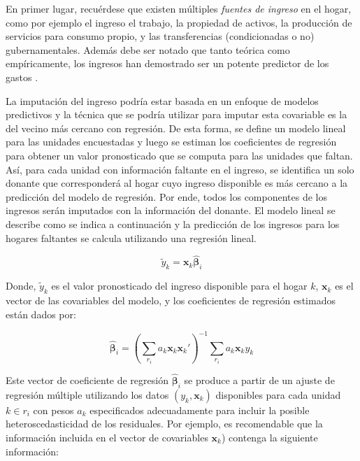 \documentclass[
  12pt,
]{book}
\begin{document}
En primer lugar, recuérdese que existen múltiples \emph{fuentes de ingreso} en el hogar, como por ejemplo el ingreso el trabajo, la propiedad de activos, la producción de servicios para consumo propio, y las transferencias (condicionadas o no) gubernamentales. Además debe ser notado que tanto teórica como empíricamente, los ingresos han demostrado ser un potente predictor de los gastos \citep{Starick_Watson_2011}.

La imputación del ingreso podría estar basada en un enfoque de modelos predictivos y la técnica que se podría utilizar para imputar esta covariable es la del vecino más cercano con regresión. De esta forma, se define un modelo lineal para las unidades encuestadas y luego se estiman los coeficientes de regresión para obtener un valor pronosticado que se computa para las unidades que faltan. Así, para cada unidad con información faltante en el ingreso, se identifica un solo donante que corresponderá al hogar cuyo ingreso disponible es más cercano a la predicción del modelo de regresión. Por ende, todos los componentes de los ingresos serán imputados con la información del donante. El modelo lineal se describe como se indica a continuación y la predicción de los ingresos para los hogares faltantes se calcula utilizando una regresión lineal.

\[\tilde{y}_k = \mathbf{x}_k \hat{\boldsymbol{\beta}}_i\]

Donde, \(\tilde{y}_k\) es el valor pronosticado del ingreso disponible para el hogar \(k\), \(\mathbf{x}_k\) es el vector de las covariables del modelo, y los coeficientes de regresión estimados están dados por:

\[
\hat{\boldsymbol{\beta}}_i = \left(\sum_{r_i} a_k\mathbf{x}_k\mathbf{x}_k'\right)^{-1}
\sum_{r_i} a_k\mathbf{x}_ky_k
\]

Este vector de coeficiente de regresión \(\hat{\boldsymbol{\beta}}_i\) se produce a partir de un ajuste de regresión múltiple utilizando los datos \((y_k, \mathbf{x}_k)\) disponibles para cada unidad \(k \in r_i\) con pesos \(a_k\) especificados adecuadamente para incluir la posible heteroscedasticidad de los residuales. Por ejemplo, es recomendable que la información incluida en el vector de covariables \(\mathbf{x}_k\)) contenga la siguiente información:
\end{document}
